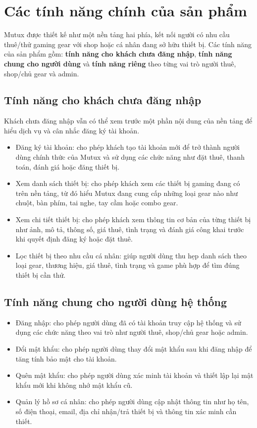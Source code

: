 \section{Các tính năng chính của sản phẩm}

Mutux được thiết kế như một nền tảng hai phía, kết nối người có nhu cầu thuê/thử gaming gear với shop hoặc cá nhân đang sở hữu thiết bị. Các tính năng của sản phẩm gồm: \textbf{tính năng cho khách chưa đăng nhập}, \textbf{tính năng chung cho người dùng} và \textbf{tính năng riêng} theo từng vai trò người thuê, shop/chủ gear và admin.
\subsection{Tính năng cho khách chưa đăng nhập}

Khách chưa đăng nhập vẫn có thể xem trước một phần nội dung của nền tảng để hiểu dịch vụ và cân nhắc đăng ký tài khoản.

\begin{itemize}
    \item Đăng ký tài khoản: cho phép khách tạo tài khoản mới để trở thành người dùng chính thức của Mutux và sử dụng các chức năng như đặt thuê, thanh toán, đánh giá hoặc đăng thiết bị.
    \item Xem danh sách thiết bị: cho phép khách xem các thiết bị gaming đang có trên nền tảng, từ đó hiểu Mutux đang cung cấp những loại gear nào như chuột, bàn phím, tai nghe, tay cầm hoặc combo gear.
    \item Xem chi tiết thiết bị: cho phép khách xem thông tin cơ bản của từng thiết bị như ảnh, mô tả, thông số, giá thuê, tình trạng và đánh giá công khai trước khi quyết định đăng ký hoặc đặt thuê.
    \item Lọc thiết bị theo nhu cầu cá nhân: giúp người dùng thu hẹp danh sách theo loại gear, thương hiệu, giá thuê, tình trạng và game phù hợp để tìm đúng thiết bị cần thử.
\end{itemize}
\subsection{Tính năng chung cho người dùng hệ thống}

\begin{itemize}
    \item Đăng nhập: cho phép người dùng đã có tài khoản truy cập hệ thống và sử dụng các chức năng theo vai trò như người thuê, shop/chủ gear hoặc admin.
    \item Đổi mật khẩu: cho phép người dùng thay đổi mật khẩu sau khi đăng nhập để tăng tính bảo mật cho tài khoản.
    \item Quên mật khẩu: cho phép người dùng xác minh tài khoản và thiết lập lại mật khẩu mới khi không nhớ mật khẩu cũ.
    \item Quản lý hồ sơ cá nhân: cho phép người dùng cập nhật thông tin như họ tên, số điện thoại, email, địa chỉ nhận/trả thiết bị và thông tin xác minh cần thiết.
\end{itemize}

